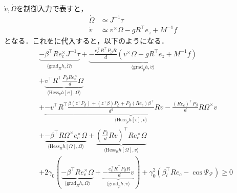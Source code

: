$\dot{v}, \dot{\Omega}$を制御入力で表すと，
\begin{equation}
\begin{aligned}
\dot{\Omega} &\simeq J^{-1} \tau \\
\dot{v} &\simeq v^\times \Omega - g R^\top e_z + M^{-1} f
\label{eq:acceleration_control}
\end{aligned}
\end{equation}
となる．これをに代入すると，以下のようになる．
\begin{equation}
\begin{aligned}
&\underbrace{-\beta^\top R e_c^\times J^{-1} \tau}_{\langle \mathrm{grad}_R h, \dot{\Omega} \rangle} + \underbrace{-\frac{e_c^\top R^\top P_\beta R}{d} (v^\times \Omega - g R^\top e_z + M^{-1} f)}_{\langle \mathrm{grad}_p h, \dot{v} \rangle} \\
&+ \underbrace{v^\top R^\top \frac{P_\beta R e_c^\times}{d} \Omega}_{\langle \mathrm{Hess}_p h[v], \Omega \rangle} \\
&+ \underbrace{-v^\top R^\top \frac{\beta (z^\top P_\beta) + (z^\top \beta) P_\beta + P_\beta (R e_c) \beta^\top}{d^2} R v - \frac{(R e_c)^\top P_\beta}{d} R \Omega^\times v}_{\langle \mathrm{Hess}_p h[v], v \rangle} \\
&+ \underbrace{-\beta^\top R \Omega^\times e_c^\times \Omega}_{\langle \mathrm{Hess}_R h[\Omega], \Omega \rangle} + \underbrace{\left( \frac{P_\beta}{d} R v \right)^\top R e_c^\times \Omega}_{\langle \mathrm{Hess}_R h[\Omega], v \rangle} \\
&+ 2 \gamma_0 \left( \underbrace{-\beta^\top R e_c^\times \Omega}_{\langle \mathrm{grad}_R h, \Omega \rangle} + \underbrace{-\frac{e_c^\top R^\top P_\beta R}{d} v}_{\langle \mathrm{grad}_p h, v \rangle} \right) + \gamma_0^2 (\beta_l^{\top} R e_c - \cos \Psi_\mathcal{F}) \geq 0
\label{eq:hocbf_constraint_control}
\end{aligned}
\end{equation}

